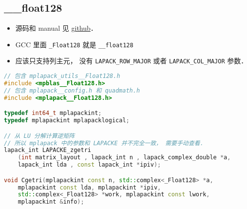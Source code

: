 
\begin{issues}
\issueDraft
\end{issues}


\subsection{__float128}
\begin{itemize}
\item 源码和 manual 见 \href{https://github.com/nakatamaho/mplapack}{github}．
\item GCC 里面 \verb|_Float128| 就是 \verb|__float128|
\item 应该只支持列主元， 没有 \verb|LAPACK_ROW_MAJOR| 或者 \verb|LAPACK_COL_MAJOR| 参数．
\end{itemize}

\begin{lstlisting}[language=cpp]
// 包含 mplapack_utils__Float128.h
#include <mpblas__Float128.h>
// 包含 mplapack__config.h 和 quadmath.h
#include <mplapack__Float128.h>

typedef int64_t mplapackint;
typedef mplapackint mplapacklogical;

// 从 LU 分解计算逆矩阵
// 所以 mplapack 中的参数和 LAPACKE 并不完全一致， 需要手动查看．
lapack_int LAPACKE_zgetri
    (int matrix_layout , lapack_int n , lapack_complex_double *a,
    lapack_int lda , const lapack_int *ipiv);

void Cgetri(mplapackint const n, std::complex<_Float128> *a,
    mplapackint const lda, mplapackint *ipiv,
    std::complex<_Float128> *work, mplapackint const lwork,
    mplapackint &info);
\end{lstlisting}
